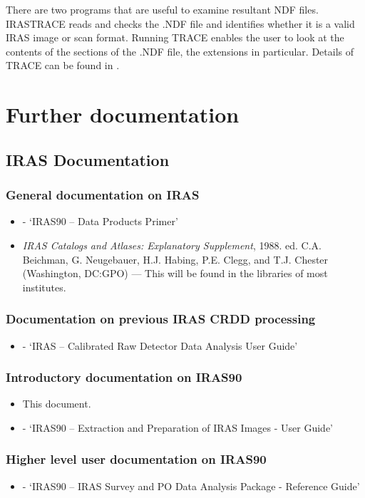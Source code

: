 \documentclass[twoside,11pt]{starlink}
\begin{document}
There are two programs that are useful to examine resultant NDF files.
IRASTRACE reads and checks the .NDF file and identifies whether it is a valid
IRAS image or scan format. Running TRACE enables  the user to look at the
contents of the sections of the .NDF file, the extensions in particular. Details
of TRACE can be found in .

\section{Further documentation
\label{a:docs}}

\subsection{IRAS Documentation}
\subsubsection {General documentation on IRAS}
\begin{itemize}
\item \textbf{} - `IRAS90 -- Data Products Primer'
\item \emph{IRAS Catalogs and Atlases: Explanatory Supplement}, 1988. ed. C.A.
Beichman, G. Neugebauer, H.J. Habing, P.E. Clegg, and T.J. Chester (Washington,
DC:GPO) --- This will be found in the libraries of most institutes.
\end{itemize}
\subsubsection {Documentation on previous IRAS CRDD processing}
\begin{itemize}
\item \textbf{} - `IRAS -- Calibrated Raw Detector Data
Analysis User Guide'
\end{itemize}
\subsubsection {Introductory documentation on IRAS90}
\begin{itemize}
\item This document.
\item \textbf{} - `IRAS90 -- Extraction and Preparation
of IRAS Images - User Guide'
\end{itemize}
\subsubsection {Higher level user documentation on IRAS90}
\begin{itemize}
\item \textbf{} - `IRAS90 -- IRAS Survey and PO Data
Analysis Package - Reference Guide'
\end{itemize}
\end{document}
